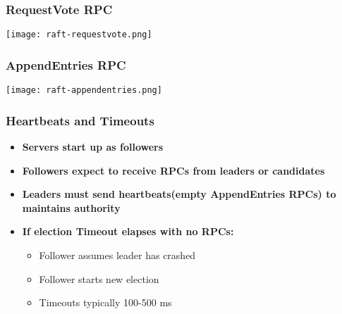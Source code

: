 \begin{frame}
    \frametitle{RequestVote RPC}
    \texttt{[image: raft-requestvote.png]}
\end{frame}

\begin{frame}
    \frametitle{AppendEntries RPC}
    \texttt{[image: raft-appendentries.png]}
\end{frame}

\begin{frame}
    \frametitle{Heartbeats and Timeouts}
    \begin{itemize}
        \item \textbf{Servers start up as followers}
        \item \textbf{Followers expect to receive RPCs from leaders or candidates}
        \item \textbf{Leaders must send \alert{heartbeats}(empty AppendEntries RPCs) to maintains authority}
        \item \textbf{If \alert{election Timeout} elapses with no RPCs:}
            \begin{itemize}
                \item Follower assumes leader has crashed
                \item Follower starts new election
                \item Timeouts typically 100-500 ms
            \end{itemize}
    \end{itemize}
\end{frame}

